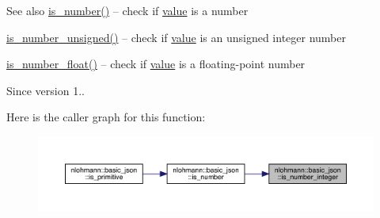 \begin{DoxySeeAlso}{See also}
\mbox{\hyperlink{classnlohmann_1_1basic__json_a2b9852390abb4b1ef5fac6984e2fc0f3}{is\+\_\+number()}} -- check if \mbox{\hyperlink{classnlohmann_1_1basic__json_af9c51328fbe1da75eca750be3009917a}{value}} is a number 

\mbox{\hyperlink{classnlohmann_1_1basic__json_abc7378cba0613a78b9aad1c8e7044bb0}{is\+\_\+number\+\_\+unsigned()}} -- check if \mbox{\hyperlink{classnlohmann_1_1basic__json_af9c51328fbe1da75eca750be3009917a}{value}} is an unsigned integer number 

\mbox{\hyperlink{classnlohmann_1_1basic__json_a33b4bf898b857c962e798fc7f6e86e70}{is\+\_\+number\+\_\+float()}} -- check if \mbox{\hyperlink{classnlohmann_1_1basic__json_af9c51328fbe1da75eca750be3009917a}{value}} is a floating-\/point number
\end{DoxySeeAlso}
\begin{DoxySince}{Since}
version 1.. 
\end{DoxySince}
Here is the caller graph for this function\+:
\nopagebreak
\begin{figure}[H]
\begin{center}
\leavevmode
\includegraphics[width=350pt]{classnlohmann_1_1basic__json_abac8af76067f1e8fdca9052882c74428_icgraph}
\end{center}
\end{figure}
\mbox{\label{classnlohmann_1_1basic__json_abc7378cba0613a78b9aad1c8e7044bb0}} 
